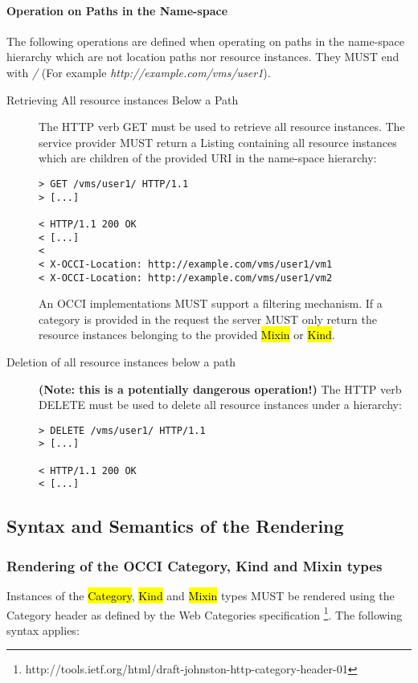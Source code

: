 \documentclass[10pt,a4paper]{article}
\begin{document}
\paragraph{Operation on Paths in the Name-space}
The following operations are defined when operating on paths in the
name-space hierarchy which are not location paths nor resource
instances. They MUST end with \emph{/} (For example
\emph{http://example.com/vms/user1}).

\begin{description}
\item[Retrieving All resource instances Below a Path] The HTTP verb
  GET must be used to retrieve all resource instances. The service
  provider MUST return a Listing containing all resource instances
  which are children of the provided URI in the name-space hierarchy:
\begin{verbatim}
> GET /vms/user1/ HTTP/1.1
> [...]
 
< HTTP/1.1 200 OK
< [...]
< 
< X-OCCI-Location: http://example.com/vms/user1/vm1
< X-OCCI-Location: http://example.com/vms/user1/vm2
\end{verbatim}
An OCCI implementations MUST support a filtering mechanism. If a
category is provided in the request the server MUST only return the
resource instances belonging to the provided \hl{Mixin} or \hl{Kind}.

\item[Deletion of all resource instances below a path] \textbf{(Note:
  this is a potentially dangerous operation!)} The HTTP verb DELETE
  must be used to delete all resource instances under a hierarchy:
\begin{verbatim}
> DELETE /vms/user1/ HTTP/1.1
> [...]
 
< HTTP/1.1 200 OK
< [...]
\end{verbatim}
\end{description}

\subsection{Syntax and Semantics of the Rendering}
\label{sec:syntax}

\subsubsection{Rendering of the OCCI Category, Kind and Mixin types}
Instances of the \hl{Category}, \hl{Kind} and \hl{Mixin} types \cite{occi:core}
MUST be rendered using the Category header as defined by the Web Categories
specification%
\footnote{http://tools.ietf.org/html/draft-johnston-http-category-header-01}.
%
The following syntax applies:
\end{document}
